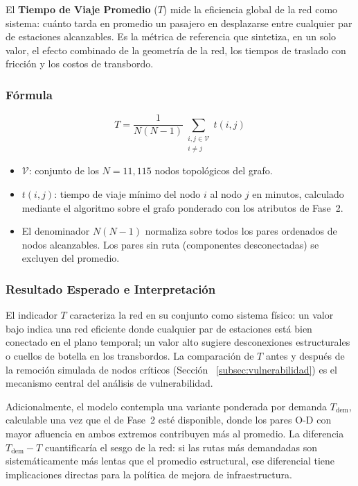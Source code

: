 El \textbf{Tiempo de Viaje Promedio} ($T$) mide la eficiencia global de la red
como sistema: cuánto tarda en promedio un pasajero en desplazarse entre
cualquier par de estaciones alcanzables. Es la métrica de referencia que
sintetiza, en un solo valor, el efecto combinado de la geometría de la red, los
tiempos de traslado con fricción y los costos de transbordo.

\subsubsection{Fórmula}
\label{subsubsec:formula-t}

\begin{equation}
    T = \frac{1}{N(N-1)} \sum_{\substack{i,j \in \mathcal{V} \\ i \neq j}} t(i,j)
    \label{eq:tiempo-viaje-promedio}
\end{equation}

\begin{itemize}
    \item $\mathcal{V}$: conjunto de los $N = 11{,}115$ nodos topológicos del
    grafo.
    \item $t(i,j)$: tiempo de viaje mínimo del nodo $i$ al nodo $j$ en minutos,
    calculado mediante el algoritmo \dijkstra{} sobre el grafo ponderado con los
    atributos de Fase~2.
    \item El denominador $N(N-1)$ normaliza sobre todos los pares ordenados de
nodos alcanzables. Los pares sin ruta (componentes desconectadas) se excluyen
    del promedio.
\end{itemize}

\subsubsection{Resultado Esperado e Interpretación}
\label{subsubsec:t-resultado-esperado}

El indicador $T$ caracteriza la red en su conjunto como sistema físico: un valor
bajo indica una red eficiente donde cualquier par de estaciones está bien
conectado en el plano temporal; un valor alto sugiere desconexiones
estructurales o cuellos de botella en los transbordos. La comparación de $T$
antes y después de la remoción simulada de nodos críticos (Sección~
\ref{subsec:vulnerabilidad}) es el mecanismo central del análisis de
vulnerabilidad.

Adicionalmente, el modelo contempla una variante ponderada por demanda
$T_{\text{dem}}$, calculable una vez que el  de Fase~2 esté
disponible, donde los pares O-D con mayor afluencia en ambos extremos
contribuyen más al promedio. La diferencia $T_{\text{dem}} - T$ cuantificaría el
sesgo de la red: si las rutas más demandadas son sistemáticamente más lentas que
el promedio estructural, ese diferencial tiene implicaciones directas para la
política de mejora de infraestructura.

